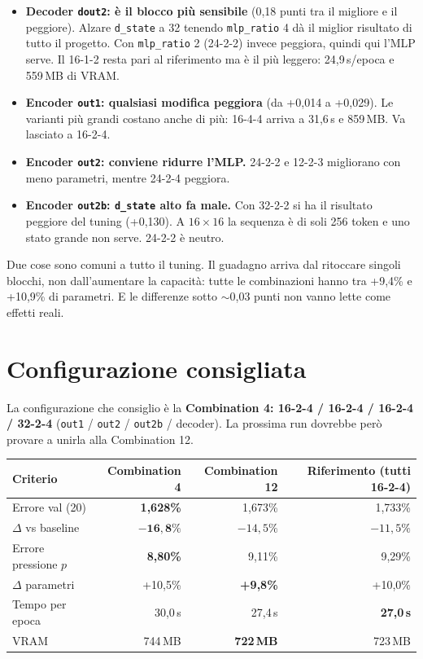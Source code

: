 \documentclass[11pt,a4paper]{article}
\newcommand{\cfg}[1]{\texttt{#1}}
\begin{document}
\begin{itemize}
  \item \textbf{Decoder \cfg{dout2}: è il blocco più sensibile} (0,18 punti tra il migliore e il peggiore). Alzare \cfg{d\_state} a 32 tenendo \cfg{mlp\_ratio} 4 dà il miglior risultato di tutto il progetto. Con \cfg{mlp\_ratio} 2 (24-2-2) invece peggiora, quindi qui l'MLP serve. Il 16-1-2 resta pari al riferimento ma è il più leggero: 24,9\,s/epoca e 559\,MB di VRAM.
  \item \textbf{Encoder \cfg{out1}: qualsiasi modifica peggiora} (da +0,014 a +0,029). Le varianti più grandi costano anche di più: 16-4-4 arriva a 31,6\,s e 859\,MB. Va lasciato a 16-2-4.
  \item \textbf{Encoder \cfg{out2}: conviene ridurre l'MLP.} 24-2-2 e 12-2-3 migliorano con meno parametri, mentre 24-2-4 peggiora.
  \item \textbf{Encoder \cfg{out2b}: \cfg{d\_state} alto fa male.} Con 32-2-2 si ha il risultato peggiore del tuning (+0,130). A $16\times16$ la sequenza è di soli 256 token e uno stato grande non serve. 24-2-2 è neutro.
\end{itemize}

Due cose sono comuni a tutto il tuning. Il guadagno arriva dal ritoccare singoli blocchi, non dall'aumentare la capacità: tutte le combinazioni hanno tra +9,4\% e +10,9\% di parametri. E le differenze sotto $\sim$0,03 punti non vanno lette come effetti reali.

\section{Configurazione consigliata}

La configurazione che consiglio è la \textbf{Combination 4: 16-2-4 / 16-2-4 / 16-2-4 / 32-2-4} (\cfg{out1} / \cfg{out2} / \cfg{out2b} / decoder). La prossima run dovrebbe però provare a unirla alla Combination 12.

\begin{table}[h!]
\centering
\begin{tabular}{@{}lrrr@{}}
\toprule
Criterio & Combination 4 & Combination 12 & Riferimento (tutti 16-2-4) \\
\midrule
Errore val (20) & \textbf{1,628\%} & 1,673\% & 1,733\% \\
$\Delta$ vs baseline & $\mathbf{-16{,}8\%}$ & $-14{,}5\%$ & $-11{,}5\%$ \\
Errore pressione $p$ & \textbf{8,80\%} & 9,11\% & 9,29\% \\
$\Delta$ parametri & +10,5\% & \textbf{+9,8\%} & +10,0\% \\
Tempo per epoca & 30,0\,s & 27,4\,s & \textbf{27,0\,s} \\
VRAM & 744\,MB & \textbf{722\,MB} & 723\,MB \\
\bottomrule
\end{tabular}
\end{table}
\end{document}
